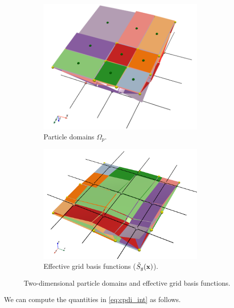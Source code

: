\begin{figure}[htbp!]
  \begin{subfigure}[t]{0.5\textwidth}
    \centering
    \includegraphics[width=0.9\textwidth]{Figs/mpm_basis/cpdi_particle_domains.png}
    \caption{Particle domains $\Omega_p$.}
  \end{subfigure}
  \begin{subfigure}[t]{0.5\textwidth}
    \centering
    \includegraphics[width=0.9\textwidth]{Figs/mpm_basis/cpdi_effective_basis.png}
    \caption{Effective grid basis functions ($\tilde{S}_g(\mathbf{x})$).}
  \end{subfigure}
  \caption{Two-dimensional \CPDI particle domains and effective grid basis functions.} 
  \label{fig:cpdi_eff}
\end{figure}


We can compute the quantities in \eqref{eq:cpdi_int} as follows.

